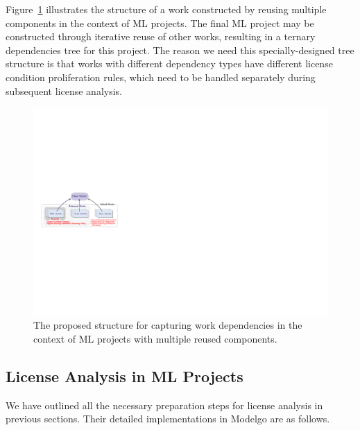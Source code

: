 Figure~\ref{fig:stru} illustrates the structure of a work constructed by reusing multiple components in the context of ML projects.
The final ML project may be constructed through iterative reuse of other works, resulting in a ternary dependencies tree for this project.
The reason we need this specially-designed tree structure is that works with different dependency types have different license condition proliferation rules, which need to be handled separately during subsequent license analysis. 


\begin{figure}[t]
    \centering
    \includegraphics[width=\linewidth]{fig/structure.pdf}
    \caption{The proposed structure for capturing work dependencies in the context of ML projects with multiple reused components.}
    \Description{}
    \label{fig:stru}
\end{figure}

\subsection{License Analysis in ML Projects}

We have outlined all the necessary preparation steps for license analysis in previous sections.
Their detailed implementations in Modelgo are as follows.

